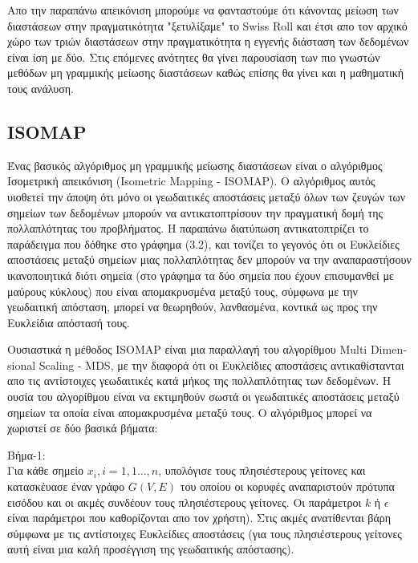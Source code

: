 \par
\vspace*{1cm}
Απο την παραπάνω απεικόνιση μπορούμε να φανταστούμε ότι κάνοντας μείωση των διαστάσεων στην πραγματικότητα "ξετυλίξαμε" το \textlatin{Swiss Roll} και έτσι απο τον αρχικό χώρο των τριών διαστάσεων στην πραγματικότητα η εγγενής διάσταση των δεδομένων είναι ίση με δύο. Στις επόμενες ανότητες θα γίνει παρουσίαση των πιο γνωστών μεθόδων μη γραμμικής μείωσης διαστάσεων καθώς επίσης θα γίνει και η μαθηματική τους ανάλυση.


\subsection{\textlatin{ISOMAP}}
\par
Ένας βασικός αλγόριθμος μη γραμμικής μείωσης διαστάσεων είναι ο αλγόριθμος Ισομετρική απεικόνιση \textlatin{(Isometric Mapping - ISOMAP)}. Ο αλγόριθμος αυτός υιοθετεί την άποψη ότι μόνο οι γεωδαιτικές αποστάσεις μεταξύ όλων των ζευγών των σημείων των δεδομένων μπορούν να αντικατοπτρίσουν την πραγματική δομή της πολλαπλότητας του προβλήματος. Η παραπάνω διατύπωση αντικατοπτρίζει το παράδειγμα που δόθηκε στο γράφημα (3.2), και τονίζει το γεγονός ότι οι Ευκλείδιες αποστάσεις μεταξύ σημείων μιας πολλαπλότητας δεν μπορούν να την αναπαραστήσουν ικανοποιητικά διότι σημεία (στο γράφημα τα δύο σημεία που έχουν επισυμανθεί με μαύρους κύκλους) που είναι απομακρυσμένα μεταξύ τους, σύμφωνα με την γεωδαιτική απόσταση, μπορεί να θεωρηθούν, λανθασμένα, κοντικά ως προς την Ευκλείδια απόστασή τους.
\par
Ουσιαστικά η μέθοδος \textlatin{ISOMAP} είναι μια παραλλαγή του αλγορίθμου \textlatin{Multi Dimensional Scaling - MDS}, με την διαφορά ότι οι Ευκλείδιες αποστάσεις αντικαθίστανται απο τις αντίστοιχες γεωδαιτικές κατά μήκος της πολλαπλότητας των δεδομένων. Η ουσία του αλγορίθμου είναι να εκτιμηθούν σωστά οι γεωδαιτικές αποστάσεις μεταξύ σημείων τα οποία είναι απομακρυσμένα μεταξύ τους. Ο αλγόριθμος μπορεί να χωριστεί σε δύο βασικά βήματα:
\par
Βήμα-1: \\ Για κάθε σημείο $x_{i},i=1,1\ldots,n$, υπολόγισε τους πλησιέστερους γείτονες και κατασκέυασε έναν γράφο $G(V,E)$ του οποίου οι κορυφές αναπαριστούν πρότυπα εισόδου και οι ακμές συνδέουν τους πλησιέστερους γείτονες. Οι παράμετροι $k$ ή $\epsilon$ είναι παράμετροι που καθορίζονται απο τον χρήστη). Στις ακμές ανατίθενται βάρη σύμφωνα με τις αντίστοιχες Ευκλείδιες αποστάσεις (για τους πλησιέστερους γείτονες αυτή είναι μια καλή προσέγγιση της γεωδαιτικής απόστασης).
